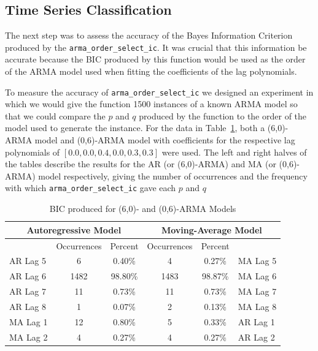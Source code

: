 \documentclass[oneside,12pt,openany]{book}
\begin{document}
    \subsection{Time Series Classification}
    
      The next step was to assess the accuracy of the Bayes Information Criterion produced by the \texttt{arma\_order\_select\_ic}. It was crucial that this information be accurate because the BIC produced by this function would be used as the order of the ARMA model used when fitting the coefficients of the lag polynomials. 
      
      To measure the accuracy of \texttt{arma\_order\_select\_ic} we designed an experiment in which we would give the function 1500 instances of a known ARMA model so that we could compare the $p$ and $q$ produced by the function to the order of the model used to generate the instance. For the data in Table~\ref{tab:bic6}, both a (6,0)-ARMA model and (0,6)-ARMA model with coefficients for the respective lag polynomials of $[0.0,0.0,0.4,0.0,0.3,0.3]$ were used. The left and right halves of the tables describe the results for the AR (or (6,0)-ARMA) and MA (or (0,6)-ARMA) model respectively, giving the number of occurrences and the frequency with which \texttt{arma\_order\_select\_ic} gave each $p$ and $q$
      
      \FloatBarrier
    
    \begin{table}[hbt!]
        \centering
        \begin{tabular}{|l|c|c|c|c|l|}
            \hline
            \multicolumn{3}{|c|}{Autoregressive Model} & \multicolumn{3}{c|}{Moving-Average Model} \\ \hline
            \cellcolor{black} & Occurrences & Percent & Occurrences & Percent & \cellcolor{black} \\ \hline
            AR Lag 5 & 6 & 0.40\% & 4 & 0.27\% & MA Lag 5 \\ \hline
            AR Lag 6 & 1482 & 98.80\% & 1483 & 98.87\% & MA Lag 6 \\ \hline
            AR Lag 7 & 11 & 0.73\% & 11 & 0.73\% & MA Lag 7 \\ \hline
            AR Lag 8 & 1 & 0.07\% & 2 & 0.13\% & MA Lag 8 \\ \hline
            MA Lag 1 & 12 & 0.80\% & 5 & 0.33\% & AR Lag 1 \\ \hline
            MA Lag 2 & 4 & 0.27\% & 4 & 0.27\% & AR Lag 2 \\ \hline
        \end{tabular}
        \caption{BIC produced for (6,0)- and (0,6)-ARMA Models}
        \label{tab:bic6}
    \end{table}
    
\end{document}
